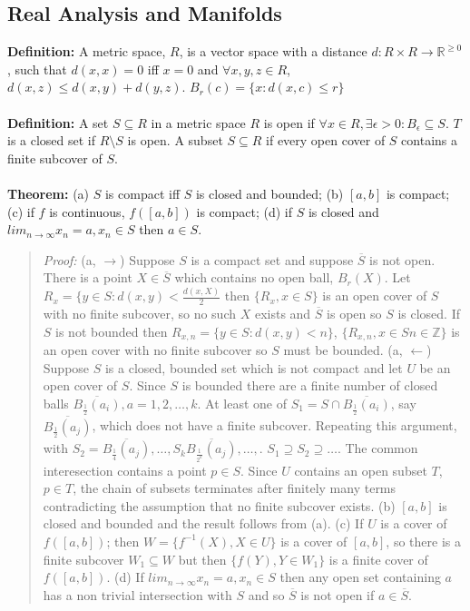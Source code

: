 \subsection {Real Analysis and Manifolds}
{\bf Definition:} A metric space, $R$, is a vector space with a distance
$d: R \times R \rightarrow {\mathbb R}^{\ge 0}$,
such that $d(x,x) = 0$ iff $x = 0$ and $\forall x, y, z \in R$, $d(x,z) \leq d(x, y) + d(y, z)$.
$B_r(c) = \{ x: d(x,c) \leq r \}$
\\
\\
{\bf Definition:} A set $S \subseteq R$ in a metric space $R$ is open if $\forall x \in R, \exists \epsilon > 0:
B_{\epsilon} \subseteq S$.  $T$ is a closed set if $R \setminus S$ is open.  A subset $S \subseteq R$ if every
open cover of $S$ contains a finite subcover of $S$.
\\
\\
{\bf Theorem:} (a) $S$ is compact iff $S$ is closed and bounded; (b) $[a, b]$ is compact;
(c) if $f$ is continuous, $f([a,b])$ is compact; (d) if $S$ is closed and
$lim_{n \rightarrow \infty} x_n = a, x_n \in S$ then $a \in S$.
\begin{quote}
\emph{Proof:}
(a, $\rightarrow$) Suppose $S$ is a compact set and suppose ${\overline S}$ is not open.  There is a point
$X \in {\overline S}$ which contains no open ball, $B_r(X)$.  Let $R_x = \{y \in S: d(x,y) < {\frac 
{d(x, X)} 2}$ then $\{R_x, x \in S \}$ is an open cover of $S$ with no finite subcover, so
no such $X$ exists and ${\overline S}$ is open so $S$ is closed.  If $S$ is not bounded then
$R_{x, n} = \{ y \in S: d(x,y) < n \}$, $\{R_{x, n}, x \in S n \in {\mathbb Z} \}$
is an open cover with no finite subcover so $S$ must be bounded. (a, $\leftarrow$) Suppose $S$
is a closed, bounded set which is not compact and let $U$ be an open cover of $S$.  Since
$S$ is bounded there are a finite number of closed balls ${\overline {B_{\frac 1 2}(a_i)}}, a =
1, 2, \ldots, k$.  At least one of $S_1 = S \cap {\overline {B_{\frac 1 2}(a_i)}}$, say
${\overline {B_{\frac 1 2}(a_j)}}$, which does not have a finite subcover.  Repeating this argument,
with $S_2 = {\overline {B_{\frac 1 4}(a_j)}},  \ldots , S_k{\overline {B_{\frac 1 {2^k}}(a_j)}}, \ldots ,$.
$S_1 \supseteq S_2 \supseteq \ldots$.  The common interesection contains a point $p \in S$.  Since
$U$ contains an open subset $T$, $p \in T$, the chain of subsets terminates after finitely many
terms contradicting the assumption that no finite subcover exists.
(b) $[a,b]$ is closed and bounded and the result follows from (a). (c) If $U$ is a cover of
$f([a,b])$; then $W = \{f^{-1}(X), X \in U \}$ is a cover of $[a,b]$, so there is a finite 
subcover $W_1 \subseteq W$ but then $\{f(Y), Y \in W_1 \}$ is a finite cover of $f([a,b])$.
(d) If $lim_{n \rightarrow \infty} x_n = a, x_n \in S$ then any open set containing $a$
has a non trivial intersection with $S$ and so ${\overline S}$ is not open if $a \in {\overline S}$.
\end{quote}
